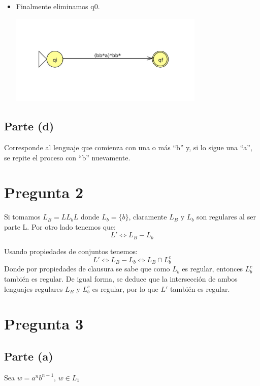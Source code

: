 \documentclass[11pt,letterpaper]{article}
\begin{document}
\begin{itemize}
\begin{center}
\end{center}
\item{Finalmente eliminamos q0.}
\begin{center}
\includegraphics[height=4.3cm]{tarea1-c4.png}
\end{center}
\end{itemize}

\subsection{Parte (d)}
Corresponde al lenguaje que comienza con una o más ``b'' y, si lo sigue una ``a'', se repite el proceso con ``b'' nuevamente.

\section{Pregunta 2}
Si tomamos $L_B = LL_bL$ \hspace{0.1cm} donde $L_b = \{b\}$, claramente $L_B$ y $L_b$ son regulares al ser parte L. Por otro lado tenemos que: 
\begin{equation}
	L' \Leftrightarrow L_B - L_b
\end{equation}

Usando propiedades de conjuntos tenemos:
\begin{equation}
	L' \Leftrightarrow L_B - L_b \Leftrightarrow  L_B \cap L_b^c
\end{equation}
Donde por propiedades de clausura se sabe que como $L_b$ es regular, entonces $L_b^c$ también es regular. De igual forma, se deduce que la intersección de ambos lenguajes regulares $L_B$ y $L_b^c$ es regular, por lo que $L'$ también es regular.


\section{Pregunta 3}
\subsection{Parte (a)}
Sea $w = a^nb^{n-1}$, $w \in  L_{1}$
\end{document}
